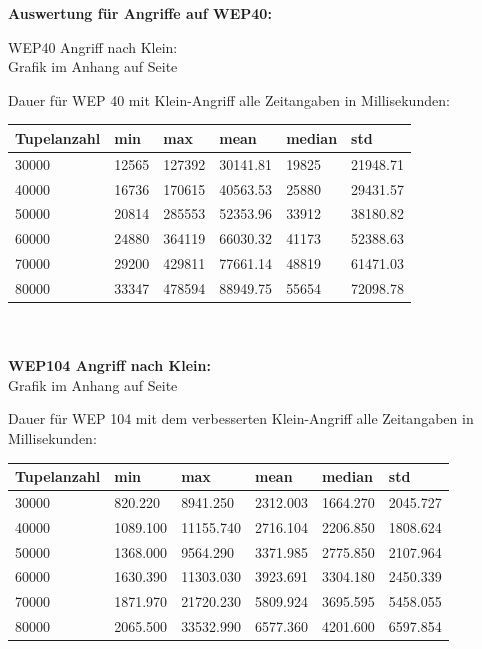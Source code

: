 \documentclass[10pt,a4paper]{article}
\begin{document}
\textbf{Auswertung für Angriffe auf WEP40:}

WEP40 Angriff nach Klein:\\

Grafik im Anhang auf Seite \pageref{fig:wep40_suc}


Dauer für WEP 40 mit Klein-Angriff alle Zeitangaben in Millisekunden:\\

\begin{tabular}{|l|l|l|l|l|l|}
	\hline
	Tupelanzahl & min      	& max 		& mean 		&   median 	&      std \\
	\hline
	30000 		& 12565		& 127392 	& 30141.81  &	19825 	& 21948.71 \\
	\hline
	40000 		& 16736 	& 170615 	& 40563.53  & 	25880	& 29431.57 \\
	\hline
	50000		& 20814 	& 285553 	& 52353.96 	& 	33912 	& 38180.82\\ 
	\hline
	60000 		& 24880		& 364119 	& 66030.32 	& 	41173 	& 52388.63\\ 
	\hline
	70000 		& 29200		& 429811	& 77661.14	&  	48819 	& 61471.03\\ 
	\hline
	80000 		& 33347 	& 478594	& 88949.75	&	55654	& 72098.78\\
	\hline
	
\end{tabular}
\\\\
\textbf{WEP104 Angriff nach Klein:}\\
Grafik im Anhang auf Seite \pageref{fig:wep100_suc}

Dauer für WEP 104 mit dem verbesserten Klein-Angriff alle Zeitangaben in Millisekunden:\\


\begin{tabular}{|l|l|l|l|l|l|}
	\hline
	Tupelanzahl & min      	& max 		& mean 		&   median 	&      std \\
	\hline
	30000 		& 820.220	& 8941.250 	& 2312.003  &	1664.270& 2045.727\\
	\hline
	40000 		& 1089.100 	& 11155.740 & 2716.104  & 	2206.850& 1808.624\\
	\hline
	50000		& 1368.000 	& 9564.290 	& 3371.985 	& 	2775.850& 2107.964\\ 
	\hline
	60000 		& 1630.390	& 11303.030 & 3923.691 	& 	3304.180& 2450.339\\ 
	\hline
	70000 		& 1871.970	& 21720.230	& 5809.924	&  	3695.595& 5458.055\\ 
	\hline
	80000 		& 2065.500 	& 33532.990	& 6577.360	&	4201.600& 6597.854\\
	\hline
	
\end{tabular}
\\\\
\end{document}
